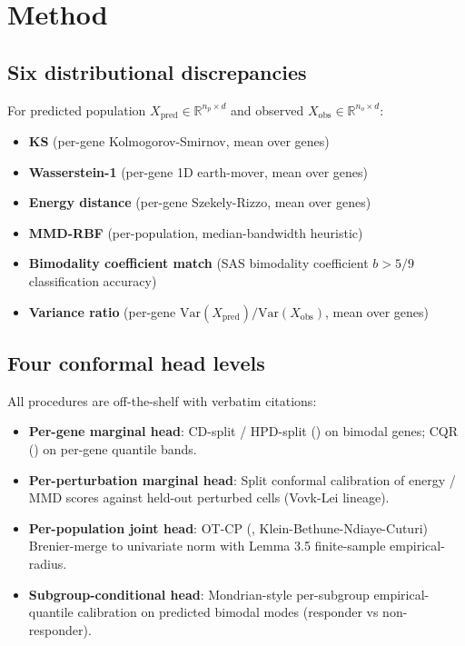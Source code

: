 \documentclass{article}
\begin{document}
\section{Method}

\subsection{Six distributional discrepancies}
For predicted population $X_{\text{pred}} \in \mathbb{R}^{n_p \times d}$ and observed $X_{\text{obs}} \in \mathbb{R}^{n_o \times d}$:
\begin{itemize}
\item \textbf{KS} (per-gene Kolmogorov-Smirnov, mean over genes)
\item \textbf{Wasserstein-1} (per-gene 1D earth-mover, mean over genes)
\item \textbf{Energy distance} (per-gene Szekely-Rizzo, mean over genes)
\item \textbf{MMD-RBF} (per-population, median-bandwidth heuristic)
\item \textbf{Bimodality coefficient match} (SAS bimodality coefficient $b > 5/9$ classification accuracy)
\item \textbf{Variance ratio} (per-gene $\text{Var}(X_{\text{pred}}) / \text{Var}(X_{\text{obs}})$, mean over genes)
\end{itemize}

\subsection{Four conformal head levels}
All procedures are off-the-shelf with verbatim citations:
\begin{itemize}
\item \textbf{Per-gene marginal head}: CD-split / HPD-split (\citet{izbicki2022}) on bimodal genes; CQR (\citet{romano2019}) on per-gene quantile bands.
\item \textbf{Per-perturbation marginal head}: Split conformal calibration of energy / MMD scores against held-out perturbed cells (Vovk-Lei lineage).
\item \textbf{Per-population joint head}: OT-CP (\citet{otcp2025}, Klein-Bethune-Ndiaye-Cuturi) Brenier-merge to univariate norm with Lemma 3.5 finite-sample empirical-radius.
\item \textbf{Subgroup-conditional head}: \citet{cauchois2024} Mondrian-style per-subgroup empirical-quantile calibration on predicted bimodal modes (responder vs non-responder).
\end{itemize}
\end{document}
